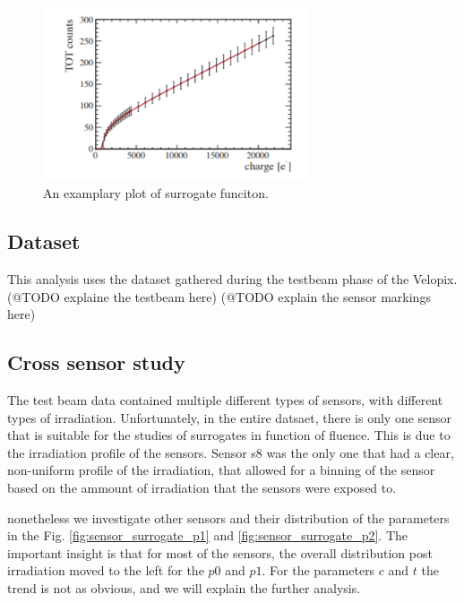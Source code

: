\begin{figure}[H]
\centering
\includegraphics[width=0.7\textwidth]{figures/chapter4/surrogates/surrogate_example.png}
\caption{An examplary plot of surrogate funciton.}
\label{fig:surrogate}
\end{figure}

\subsection{Dataset}

This analysis uses the dataset gathered during the testbeam phase of the Velopix.
(@TODO explaine the testbeam here)
(@TODO explain the sensor markings here)

\subsection{Cross sensor study}
The test beam data contained multiple different types of sensors, with different types of irradiation.
Unfortunately, in the entire datsaet, there is only one sensor that is suitable for the studies of surrogates in function of fluence.
This is due to the irradiation profile of the sensors. Sensor s8 was the only one that had a clear, non-uniform profile of the irradiation, that allowed for a binning of the sensor based on the ammount of irradiation that the sensors were exposed to.

nonetheless we investigate other sensors and their distribution of the parameters in the Fig. \ref{fig:sensor_surrogate_p1}  and \ref{fig:sensor_surrogate_p2}.
The important insight is that for most of the sensors, the overall distribution post irradiation moved to the left for the $p0$ and $p1$.
For the parameters $c$ and $t$ the trend is not as obvious, and we will explain the further analysis.


